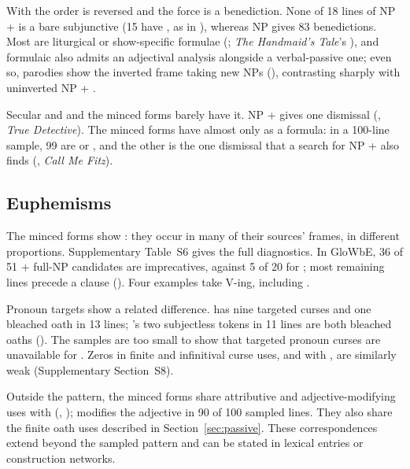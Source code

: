 \documentclass[12pt]{article}
\begin{document}
With  the order is reversed and the force is a benediction. None of 18 lines of NP +  is a bare subjunctive (15 have , as in ), whereas  NP gives 83 benedictions. Most are liturgical or show-specific formulae (; \emph{The Handmaid's Tale}'s ), and formulaic  also admits an adjectival analysis alongside a verbal-passive one; even so, parodies show the inverted frame taking new NPs (), contrasting sharply with uninverted NP + .

Secular  and  and the minced forms barely have it. NP +  gives one dismissal (, \emph{True Detective}). The minced forms have  almost only as a formula: in a 100-line sample, 99 are  or , and the other is the one dismissal that a search for NP +  also finds (, \emph{Call Me Fitz}).

\subsection{Euphemisms}
\label{sec:minced}

The minced forms show : they occur in many of their sources' frames, in different proportions. Supplementary Table~S6 gives the full diagnostics. In GloWbE, 36 of 51  + full-NP candidates are imprecatives, against 5 of 20 for ; most remaining  lines precede a clause (). Four  examples take  V-ing, including .

Pronoun targets show a related difference.  has nine targeted curses and one bleached oath in 13 lines; 's two subjectless tokens in 11 lines are both bleached oaths (). The samples are too small to show that targeted pronoun curses are unavailable for . Zeros in finite and infinitival curse uses, and with , are similarly weak (Supplementary Section~S8).

Outside the pattern, the minced forms share attributive and adjective-modifying uses with  (, );  modifies the adjective in 90 of 100 sampled lines. They also share the finite oath uses described in Section~\ref{sec:passive}. These correspondences extend beyond the sampled pattern and can be stated in lexical entries or construction networks.
\end{document}
